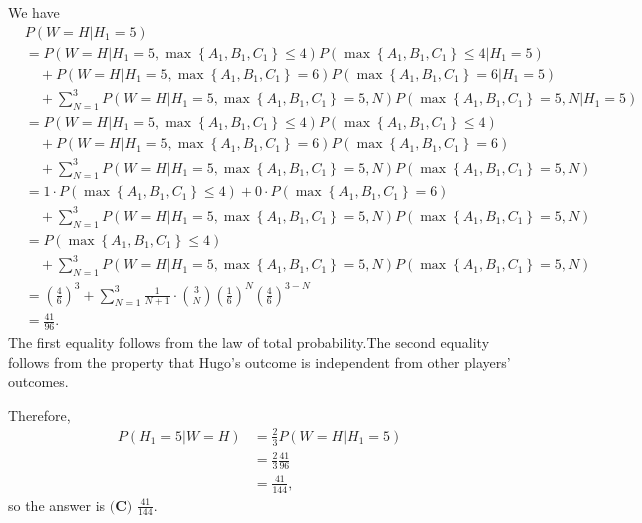 \begin{enumerate}
 We have
 \begin{align*} & P \left( W = H | H_1 = 5 \right) \\ & = P \left( W = H | H_1 = 5 , \max \left\{ A_1, B_1, C_1 \right\} \leq 4 \right) P \left( \max \left\{ A_1, B_1, C_1 \right\} \leq 4 | H_1 = 5 \right) \\ & \quad + P \left( W = H | H_1 = 5 , \max \left\{ A_1, B_1, C_1 \right\} = 6 \right) P \left( \max \left\{ A_1, B_1, C_1 \right\} = 6 | H_1 = 5 \right) \\ & \quad + \sum_{N = 1}^3 P \left( W = H | H_1 = 5 , \max \left\{ A_1, B_1, C_1 \right\} = 5 , N \right) P \left( \max \left\{ A_1, B_1, C_1 \right\} = 5 , N  | H_1 = 5 \right) \\ & = P \left( W = H | H_1 = 5 , \max \left\{ A_1, B_1, C_1 \right\} \leq 4 \right) P \left( \max \left\{ A_1, B_1, C_1 \right\} \leq 4  \right) \\ & \quad + P \left( W = H | H_1 = 5 , \max \left\{ A_1, B_1, C_1 \right\} = 6 \right) P \left( \max \left\{ A_1, B_1, C_1 \right\} = 6 \right) \\ & \quad + \sum_{N = 1}^3 P \left( W = H | H_1 = 5 , \max \left\{ A_1, B_1, C_1 \right\} = 5 , N \right) P \left( \max \left\{ A_1, B_1, C_1 \right\} = 5 , N \right) \\ & = 1 \cdot P \left( \max \left\{ A_1, B_1, C_1 \right\} \leq 4  \right) + 0 \cdot P \left( \max \left\{ A_1, B_1, C_1 \right\} = 6 \right) \\ & \quad + \sum_{N = 1}^3 P \left( W = H | H_1 = 5 , \max \left\{ A_1, B_1, C_1 \right\} = 5 , N \right) P \left( \max \left\{ A_1, B_1, C_1 \right\} = 5 , N \right) \\ & = P \left( \max \left\{ A_1, B_1, C_1 \right\} \leq 4  \right) \\ & \quad + \sum_{N = 1}^3 P \left( W = H | H_1 = 5 , \max \left\{ A_1, B_1, C_1 \right\} = 5 , N \right) P \left( \max \left\{ A_1, B_1, C_1 \right\} = 5 , N \right) \\ & = \left( \frac{4}{6} \right)^3 + \sum_{N = 1}^3 \frac{1}{N + 1} \cdot \binom{3}{N} \left( \frac{1}{6} \right)^N \left( \frac{4}{6} \right)^{3 - N} \\ & = \frac{41}{96} . \end{align*}
The first equality follows from the law of total probability.The second equality follows from the property that Hugo's outcome is independent from other players' outcomes.

 Therefore,
 \begin{align*} P \left( H_1 = 5 | W = H \right) & = \frac{2}{3} P \left( W = H | H_1 = 5 \right) \\ & = \frac{2}{3} \frac{41}{96} \\ & = \frac{41}{144} , \end{align*}
so the answer is $\boxed{\textbf{(C) }\frac{41}{144}}$.


\end{enumerate}
